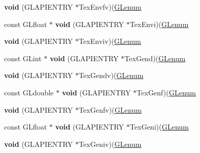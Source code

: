 \begin{DoxyCompactItemize}
{\bfseries void} (G\+L\+A\+P\+I\+E\+N\+T\+RY $\ast$Tex\+Envfv)(\hyperlink{interfacevoid}{G\+Lenum}
\item 
\mbox{\label{struct_____g_ldispatch_table_rec_abcdc71d3c2aa182ccc4ad3014ad862ee}} 
const G\+Lfloat $\ast$ {\bfseries void} (G\+L\+A\+P\+I\+E\+N\+T\+RY $\ast$Tex\+Envi)(\hyperlink{interfacevoid}{G\+Lenum}
\item 
\mbox{\label{struct_____g_ldispatch_table_rec_a11503301ecf41c6c7f434a876f627dc1}} 
{\bfseries void} (G\+L\+A\+P\+I\+E\+N\+T\+RY $\ast$Tex\+Enviv)(\hyperlink{interfacevoid}{G\+Lenum}
\item 
\mbox{\label{struct_____g_ldispatch_table_rec_a186c671a81026134773acb2995d31c36}} 
const G\+Lint $\ast$ {\bfseries void} (G\+L\+A\+P\+I\+E\+N\+T\+RY $\ast$Tex\+Gend)(\hyperlink{interfacevoid}{G\+Lenum}
\item 
\mbox{\label{struct_____g_ldispatch_table_rec_ace8769c96907a2c07b9466457191688a}} 
{\bfseries void} (G\+L\+A\+P\+I\+E\+N\+T\+RY $\ast$Tex\+Gendv)(\hyperlink{interfacevoid}{G\+Lenum}
\item 
\mbox{\label{struct_____g_ldispatch_table_rec_a058ec948b1db530e32db35441b71f144}} 
const G\+Ldouble $\ast$ {\bfseries void} (G\+L\+A\+P\+I\+E\+N\+T\+RY $\ast$Tex\+Genf)(\hyperlink{interfacevoid}{G\+Lenum}
\item 
\mbox{\label{struct_____g_ldispatch_table_rec_a1b580d22b0c16da0dea59ff97a036119}} 
{\bfseries void} (G\+L\+A\+P\+I\+E\+N\+T\+RY $\ast$Tex\+Genfv)(\hyperlink{interfacevoid}{G\+Lenum}
\item 
\mbox{\label{struct_____g_ldispatch_table_rec_ab68e6f805560a8f8c00e57195b8c8eef}} 
const G\+Lfloat $\ast$ {\bfseries void} (G\+L\+A\+P\+I\+E\+N\+T\+RY $\ast$Tex\+Geni)(\hyperlink{interfacevoid}{G\+Lenum}
\item 
\mbox{\label{struct_____g_ldispatch_table_rec_adc8002eb8b405fc64f83e6e0acc706b0}} 
{\bfseries void} (G\+L\+A\+P\+I\+E\+N\+T\+RY $\ast$Tex\+Geniv)(\hyperlink{interfacevoid}{G\+Lenum}

\end{DoxyCompactItemize}
